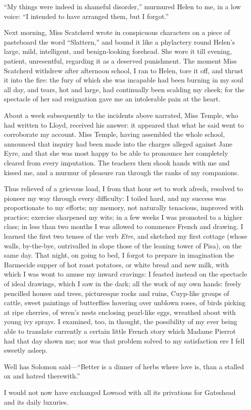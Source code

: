 \enquote{My things were indeed in shameful disorder,} murmured Helen to
me, in a low voice: \enquote{I intended to have arranged them, but I
forgot.}

Next morning, Miss Scatcherd wrote in conspicuous characters on a piece
of pasteboard the word \enquote{Slattern,} and bound it like a
phylactery round Helen's large, mild, intelligent, and benign-looking
forehead. She wore it till evening, patient, unresentful, regarding it
as a deserved punishment. The moment Miss Scatcherd withdrew after
afternoon school, I ran to Helen, tore it off, and thrust it into the
fire: the fury of which she was incapable had been burning in my soul
all day, and tears, hot and large, had continually been scalding my
cheek; for the spectacle of her sad resignation gave me an intolerable
pain at the heart.

About a week subsequently to the incidents above narrated, Miss Temple,
who had written to \Mr{} Lloyd, received his answer: it appeared that what
he said went to corroborate my account. Miss Temple, having assembled
the whole school, announced that inquiry had been made into the charges
alleged against Jane Eyre, and that she was most happy to be able to
pronounce her completely cleared from every imputation. The teachers
then shook hands with me and kissed me, and a murmur of pleasure ran
through the ranks of my companions.

Thus relieved of a grievous load, I from that hour set to work afresh,
resolved to pioneer my way through every difficulty: I toiled hard, and
my success was proportionate to my efforts; my memory, not naturally
tenacious, improved with practice; exercise sharpened my wits; in a few
weeks I was promoted to a higher class; in less than two months I was
allowed to commence French and drawing. I learned the first two tenses
of the verb \emph{Etre}, and sketched my first cottage (whose walls,
by-the-bye, outrivalled in slope those of the leaning tower of Pisa), on
the same day. That night, on going to bed, I forgot to prepare in
imagination the Barmecide supper of hot roast potatoes, or white bread
and new milk, with which I was wont to amuse my inward cravings: I
feasted instead on the spectacle of ideal drawings, which I saw in the
dark; all the work of my own hands: freely pencilled houses and trees,
picturesque rocks and ruins, Cuyp-like groups of cattle, sweet paintings
of butterflies hovering over unblown roses, of birds picking at ripe
cherries, of wren's nests enclosing pearl-like eggs, wreathed about with
young ivy sprays. I examined, too, in thought, the possibility of my
ever being able to translate currently a certain little French story
which Madame Pierrot had that day shown me; nor was that problem solved
to my satisfaction ere I fell sweetly asleep.

Well has Solomon said---\enquote{Better is a dinner of herbs where love
is, than a stalled ox and hatred therewith.}

I would not now have exchanged Lowood with all its privations for
Gateshead and its daily luxuries.
